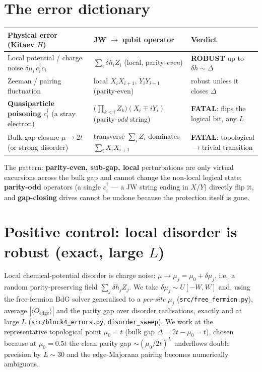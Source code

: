 \documentclass[11pt]{article}
\newcommand{\expv}[1]{\langle #1\rangle}
\newcommand{\code}[1]{\texttt{#1}}
\begin{document}
\section{The error dictionary}
\begin{center}
\renewcommand{\arraystretch}{1.35}
\begin{tabular}{@{}p{4.6cm}p{5.2cm}p{4.4cm}@{}}
\toprule
\textbf{Physical error (Kitaev $H$)} & \textbf{JW $\to$ qubit operator} & \textbf{Verdict} \\
\midrule
Local potential / charge noise $\delta\mu_i\,c_i^\dagger c_i$ &
$\sum_i\delta h_i Z_i$ \; (local, parity-\emph{even}) &
\textcolor{topological}{\textbf{ROBUST}} up to $\delta h\!\sim\!\Delta$ \\
Zeeman / pairing fluctuation &
local $X_iX_{i+1},\,Y_iY_{i+1}$ (parity-even) &
robust unless it closes $\Delta$ \\
\textbf{Quasiparticle poisoning} $c_i^\dagger$ (a stray electron) &
$\bigl(\prod_{k<i}Z_k\bigr)(X_i\mp iY_i)$ \; (parity-\emph{odd} string) &
\textcolor{trivial}{\textbf{FATAL}}: flips the logical bit, any $L$ \\
Bulk gap closure $\mu\to 2t$ (or strong disorder) &
transverse $\sum_i Z_i$ dominates $\sum_i X_iX_{i+1}$ &
\textcolor{trivial}{\textbf{FATAL}}: topological$\to$trivial transition \\
\bottomrule
\end{tabular}
\end{center}

\noindent The pattern: \textbf{parity-even, sub-gap, local} perturbations are only
virtual excursions across the bulk gap and cannot change the non-local logical
state; \textbf{parity-odd} operators (a single $c_i^\dagger$ --- a JW string ending
in $X/Y$) directly flip it, and \textbf{gap-closing} drives cannot be undone
because the protection itself is gone.

\section{Positive control: local disorder is robust (exact, large $L$)}
Local chemical-potential disorder is charge noise: $\mu\to\mu_j=\mu_0+\delta\mu_j$,
i.e.\ a random parity-preserving field $\sum_j\delta h_j Z_j$. We take
$\delta\mu_j\sim U[-W,W]$ and, using the free-fermion BdG solver generalised to a
\emph{per-site} $\mu_j$ (\code{src/free\_fermion.py}), average $|\expv{O_{\mathrm{edge}}}|$
and the parity gap over disorder realisations, exactly and at large $L$
(\code{src/block4\_errors.py}, \code{disorder\_sweep}). We work at the
representative topological point $\mu_0=t$ (bulk gap $\Delta=2t-\mu_0=t$), chosen
because at $\mu_0=0.5t$ the clean parity gap $\sim(\mu_0/2t)^L$ underflows double
precision by $L\!\sim\!30$ and the edge-Majorana pairing becomes numerically
ambiguous.
\end{document}
